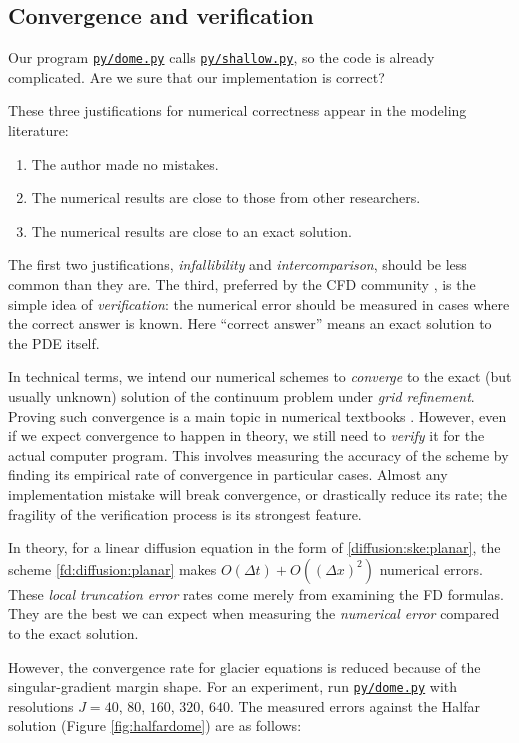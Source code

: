 \documentclass[letterpaper,final,12pt,reqno]{amsart}
\begin{document}
\subsection*{Convergence and verification}  Our program \href{https://github.com/bueler/mccarthy/blob/master/py/dome.py}{\texttt{py/dome.py}} calls \href{https://github.com/bueler/mccarthy/blob/master/py/shallow.py}{\texttt{py/shallow.py}}, so the code is already complicated.  Are we sure that our implementation is correct?

These three justifications for numerical correctness appear in the modeling literature:
\begin{enumerate}
  \item The author made no mistakes.
  \item The numerical results are close to those from other researchers.
  \item The numerical results are close to an exact solution.
\end{enumerate}
The first two justifications, \emph{infallibility} and \emph{intercomparison}, should be less common than they are.  The third, preferred by the CFD community \cite{Wesseling2001}, is the simple idea of \emph{verification}: the numerical error should be measured in cases where the correct answer is known.  Here ``correct answer'' means an exact solution to the PDE itself.

In technical terms, we intend our numerical schemes to \emph{converge} to the exact (but usually unknown) solution of the continuum problem under \emph{grid refinement}.  Proving such convergence is a main topic in numerical textbooks \cite{LeVeque2007,MortonMayers2005}.  However, even if we expect convergence to happen in theory, we still need to \emph{verify} it for the actual computer program.  This involves measuring the accuracy of the scheme by finding its empirical rate of convergence in particular cases.  Almost any implementation mistake will break convergence, or drastically reduce its rate; the fragility of the verification process is its strongest feature.

In theory, for a linear diffusion equation in the form of \eqref{diffusion:ske:planar}, the scheme \eqref{fd:diffusion:planar} makes $O(\Delta t) + O((\Delta x)^2)$ numerical errors.  These \emph{local truncation error} \cite{MortonMayers2005} rates come merely from examining the FD formulas.  They are the best we can expect when measuring the \emph{numerical error} compared to the exact solution.

However, the convergence rate for glacier equations is reduced because of the singular-gradient margin shape.  For an experiment, run \href{https://github.com/bueler/mccarthy/blob/master/py/dome.py}{\texttt{py/dome.py}} with resolutions $J=40$, $80$, $160$, $320$, $640$.  The measured errors against the Halfar solution (Figure \ref{fig:halfardome}) are as follows:
\end{document}
